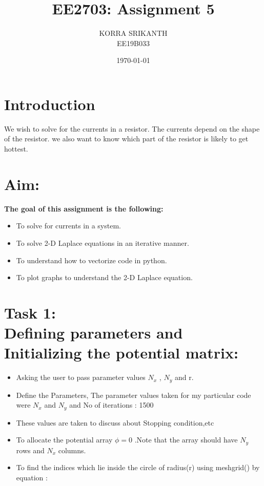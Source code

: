 \documentclass[11pt, a4paper, twoside]{article}
\title{EE2703: Assignment 5}
\author{KORRA SRIKANTH\\ {\small EE19B033}}
\date{\today}
\begin{document}
	
	
\maketitle %
\section*{Introduction}
 We wish to solve for the currents in a resistor.
 The currents depend on the shape of the resistor.
 we also want to know which part of the resistor is likely to get hottest.

 \section*{Aim:}
  \textbf{The goal of this assignment is the following:}
  \begin{itemize}
  \item
  	To solve for currents in a system.
  \item
  	To solve 2-D Laplace equations in an iterative manner.
  \item
	To understand how to vectorize code in python.
  \item
	To plot graphs to understand the 2-D Laplace equation.	
\end{itemize}  
  
\section*{Task 1:\\ Defining parameters and Initializing the potential matrix:}

\begin{itemize}
\item Asking the user to pass parameter values  \(N_x\) , \(N_y\) and r.
\item
  Define the Parameters, The parameter values taken for my particular code were \(N_x\) and \(N_y\) and No of iterations : 1500
\item
  These values are taken to discuss about Stopping condition,etc
\item
  To allocate the potential array \(\phi = 0\) .Note that the array
  should have \(N_y\) rows and \(N_x\) columns.
\item
  To find the indices which lie inside the circle of radius(r) using
  meshgrid() by equation :
\end{itemize}
\end{document}
